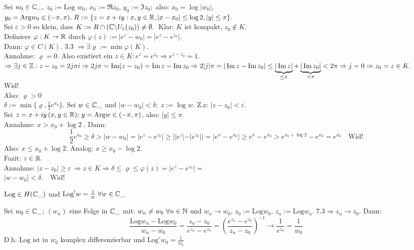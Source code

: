 \documentclass[a4paper,twoside,DIV15,BCOR12mm]{scrbook}
\def\Arg{\text{Arg}}
\def\Log{\text{Log}}
\begin{document}
\begin{beweis}
Sei $w_0 \in \mathbb{C}\_ ,$
$z_0 := \Log $ $w_0, \, x_0 := \Re z_0, \, y_0:=\Im z_0;$ also: $x_0 = \log |w_0|,$
$y_0 = \Arg w_0 \in (-\pi,\pi). \; R:= \{ z= x+iy: x,y \in \MdR, |x-x_0| \leq \log 2, |y| \leq  \pi \}.$\\
Sei $\varepsilon > 0$ so klein, dass $K:= R \cap \left( \mathbb{C} \backslash U_{\varepsilon}(z_0)\right) \not= \emptyset.\; $ Klar: $K$ ist kompakt, $z_0 \notin K.$\\
Definiere $\varphi: K \rightarrow \mathbb{R}$ durch $\varphi(z):= |e^z - w_0| = |e^z - e^{z_0}|$.\\
Dann: $\varphi \in C(K)$. 3.3 $\Rightarrow \exists \varrho := \min \varphi(K).$ \\
Annahme: $\varrho = 0$. Also existiert ein $z \in K: e^z = e^{z_0} \Rightarrow e^{z-z_0}=1.$  $\Rightarrow \exists j \in \mathbb{Z}: z-z_0 = 2j\pi i \Rightarrow 2j\pi = \mathop{\rm Im}\nolimits(z-z_0) = \mathop{\rm Im}\nolimits z - \mathop{\rm Im}\nolimits z_0 \Rightarrow 2|j|\pi = |\mathop{\rm Im}\nolimits z - \mathop{\rm Im}\nolimits z_0| \leq \underbrace{|\mathop{\rm Im}\nolimits z|}_{\leq \pi} + \underbrace{|\mathop{\rm Im}\nolimits z_0|}_{< \pi} < 2\pi \Rightarrow j = 0 \Rightarrow z_0 = z \in K.$ Wid!\\
Also: $\varrho > 0$\\
$\delta := \min\{ \varrho, \frac1{2}e^{x_0}\}.$ Sei $w \in \mathbb{C}\_$ und $|w-w_0| < \delta; \; z:=\log w.$ \; Z.z: $|z-z_0|<\varepsilon.$ \\
Sei $z=x+iy \, (x,y \in \MdR); \, y = \Arg w \in (-\pi,\pi)$, also: $|y| \leq \pi$. \\
Annahme: $x>x_0 + \log 2 \;$. Dann:\\
\[
\frac{1}{2} e^{x_0} \geq \delta > |w-w_0| = |e^z - e^{z_0}| \geq | |e^z| - |e^{z_0}| | = |e^x - e^{x_0}| \geq e^x - e^{x_0} > e^{x_0 + \log 2} - e^{x_0} = e^{x_0} \quad \mbox{Wid!}
\]
Also: $x \leq x_0 + \log 2.$ Analog: $x \geq x_0 - \log 2.$ \\
Fazit: $z\in \mathbb{R}.$\\
Annahme: $|z-z_0| \geq \varepsilon \, \Rightarrow z\in K \Rightarrow \delta \leq \varrho \leq \varphi(z) = |e^z - e^{z_0}| = $\\
$|w-w_0| < \delta. \quad \mbox{Wid!}$
\end{beweis}

\begin{satz}
$\Log \in H(\MdC\_)$ und $\Log'w= \frac1w \; \forall w \in \MdC\_$
\end{satz}

\begin{beweis}
Sei $w_0 \in \mathbb{C}\_$; $(w_n)$ eine Folge in $\mathbb{C}\_$ mit: $w_n \not= w_0 \ \forall n \in \mathbb{N}$ und $w_n \rightarrow w_0, \, z_0 := \Log w_0, \, z_n:=\Log w_n. \; 7.3 \Rightarrow z_n \rightarrow z_0.$ Dann:\\
\[
\frac{\Log w_n - \Log w_0}{w_n - w_0} = \frac{z_n-z_0}{e^{z_n}-e^{z_0}} = \left(\frac{e^{z_n}-e^{z_0}}{z_n -z_0}\right)^{-1} \rightarrow \frac1{e^{z_0}} = \frac1{w_0}
\]
D.h. $\Log$ ist in $w_0$ komplex differenzierbar und $\Log'w_0 = \frac1{w_0}$
\end{beweis}
\end{document}
